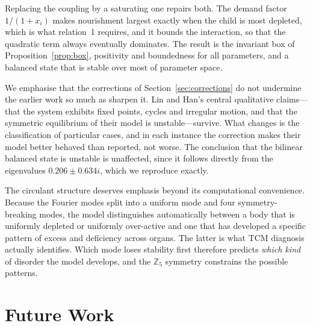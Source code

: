 \documentclass[11pt]{article}
\newcommand{\Z}{{\mathbb{Z}}}
\begin{document}
Replacing the coupling by a saturating one repairs both. The demand factor
$1/(1+x_i)$ makes nourishment largest exactly when the child is most depleted,
which is what relation~1 requires, and it bounds the interaction, so that the
quadratic term always eventually dominates. The result is the invariant box of
Proposition~\ref{prop:box}, positivity and boundedness for all parameters, and a
balanced state that is stable over most of parameter space.

We emphasise that the corrections of Section~\ref{sec:corrections} do not
undermine the earlier work so much as sharpen it. Lin and Han's central
qualitative claims---that the system exhibits fixed points, cycles and irregular
motion, and that the symmetric equilibrium of their model is unstable---survive.
What changes is the classification of particular cases, and in each instance the
correction makes their model better behaved than reported, not worse. The
conclusion that the bilinear balanced state is unstable is unaffected, since it
follows directly from the eigenvalues $0.206\pm0.634i$, which we reproduce
exactly.

The circulant structure deserves emphasis beyond its computational convenience.
Because the Fourier modes split into a uniform mode and four symmetry-breaking
modes, the model distinguishes automatically between a body that is uniformly
depleted or uniformly over-active and one that has developed a specific pattern
of excess and deficiency across organs. The latter is what TCM diagnosis
actually identifies. Which mode loses stability first therefore predicts
\emph{which kind} of disorder the model develops, and the $\Z_5$ symmetry
constrains the possible patterns.

\section{Future Work}\label{sec:future}
\end{document}
